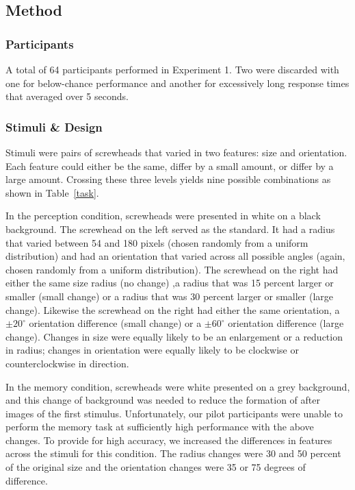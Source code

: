 \documentclass[fignum,nobf,man]{apa}
\begin{document}
\subsection{Method}

\subsubsection{Participants} A total of 64 participants performed in Experiment 1.  Two were discarded with one for below-chance performance and another for excessively long response times that averaged over 5 seconds.  

\subsubsection{Stimuli \& Design} Stimuli were pairs of screwheads that varied in two features: size and orientation.   Each feature could either be the same, differ by a small amount, or differ by a large amount.  Crossing these three levels yields nine possible combinations as shown in Table~\ref{task}.   

In the perception condition, screwheads were presented in white on a black background.  The screwhead on the left served as the standard.  It had  a radius that varied between 54 and 180 pixels (chosen randomly from a uniform distribution) and had an orientation that varied across all possible angles (again, chosen randomly from a uniform distribution).  The screwhead on the right had either the same size radius (no change) ,a radius that was 15 percent larger or smaller (small change) or a radius that was 30 percent larger or smaller (large change).  Likewise the screwhead on the right  had either the same orientation, a  $\pm20^\circ$ orientation difference (small change) or a $\pm60^\circ$ orientation difference (large change).  Changes in size were equally likely to be an enlargement or a reduction in radius; changes in orientation were equally likely to be clockwise or counterclockwise in direction.  


In the memory condition, screwheads were white presented on a grey background, and this change of background was needed to reduce the formation of after images of the first stimulus.  Unfortunately, our pilot participants were unable to perform the memory task at sufficiently high performance with the above changes.  To provide for high accuracy,  we increased the differences in features across the stimuli for this condition.  The radius changes were 30 and 50 percent of the original size and the orientation changes were 35 or 75 degrees of difference.  
\end{document}
